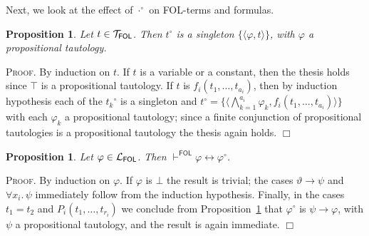\documentclass{article}
\newtheorem{proposition}[definition]{Proposition}
\newenvironment{proof}{\smallskip\textsc{Proof.}}{\hspace*{\fill}$\Box$}
\newcommand{\FOL}{\textsf{FOL}}
\newcommand{\ofun}[1]{\ensuremath{{#1}^\circ}}
\newcommand{\omap}{\ofun\cdot}
\newcommand{\pair}[2]{\ensuremath{\langle{#1},{#2}\rangle}}
\newcommand{\lang}[1]{\ensuremath{{\cal L}_{\mathsf{#1}}}}
\newcommand{\terms}[1]{\ensuremath{{\cal T}_{\mathsf{#1}}}}
\newcommand{\myvdash}[1]{\ensuremath{\vdash^{\mathsf{#1}}}}
\def\sep{.\,}
\begin{document}
\bigskip\noindent
Next, we look at the effect of {\omap} on {\FOL}-terms and formulas.
\begin{proposition}\label{ofunFOLterms} Let $t\in\terms{FOL}$.
Then $\ofun t$ is a singleton $\{\pair\varphi t\}$, with $\varphi$ a
propositional tautology.
\end{proposition}
\begin{proof}
By induction on $t$.  If $t$ is a variable or a constant, then the thesis
holds since $\top$ is a propositional tautology.  If $t$ is
$f_i(t_1,\ldots,t_{a_i})$, then by induction hypothesis each of
the $\ofun{t_k}$ is a singleton and
$\ofun t=\{\pair{\bigwedge_{k=1}^{a_i}\varphi_k}{f_i(t_1,\ldots,t_{a_i})}\}$
with each $\varphi_k$ a propositional tautology; since a finite conjunction
of propositional tautologies is a propositional tautology the thesis again
holds.
\end{proof}

\begin{proposition}\label{ofunFOLprops} Let $\varphi\in\lang{FOL}$.
Then $\myvdash{FOL}\varphi\leftrightarrow\ofun\varphi$.
\end{proposition}
\begin{proof}
By induction on $\varphi$.  If $\varphi$ is $\bot$ the result is
trivial; the cases $\vartheta\to\psi$ and $\forall x_i\sep\psi$
immediately follow from the induction hypothesis.  Finally, in the
cases $t_1=t_2$ and $P_i(t_1,\ldots,t_{r_i})$ we conclude from
Proposition~\ref{ofunFOLterms} that $\ofun\varphi$ is
$\psi\to\varphi$, with $\psi$ a propositional tautology, and the
result is again immediate.
\end{proof}
\end{document}

